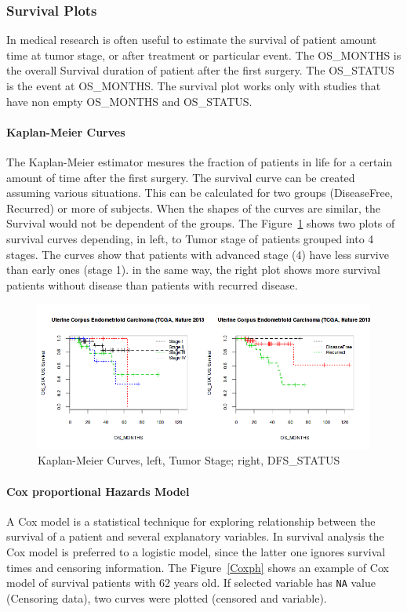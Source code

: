 \documentclass[a4paper]{article}
\begin{document}
 \subsubsection{Survival Plots}
 In medical research is often useful to estimate the survival of patient amount time at tumor stage, or after treatment or particular event. The OS\_MONTHS is the overall Survival duration of patient after the first surgery. The OS\_STATUS is the event at OS\_MONTHS. The survival plot works only with studies that have non empty OS\_MONTHS and OS\_STATUS.
 
 \paragraph{Kaplan-Meier Curves}
The Kaplan-Meier estimator mesures the fraction of patients in life for a certain amount of time after the first surgery. The survival curve can be created assuming various situations. This can be calculated for two groups (DiseaseFree, Recurred) or more of subjects. When the shapes of the curves are similar, the Survival would not be dependent of the groups. The Figure~\ref{KM} shows two plots of survival curves depending, in left, to Tumor stage of patients grouped into 4 stages. The curves show that patients with advanced stage (4) have less survive than early ones (stage 1). in the same way, the right plot shows more survival patients without disease than patients with recurred disease.   

\begin{figure}[!ht]
  \centering
 \includegraphics[scale=0.5]{image/KM.png}
 \caption{Kaplan-Meier Curves, left, Tumor Stage; right, DFS\_STATUS}
 \label{KM}
 \end{figure}
 
\paragraph{Cox proportional Hazards Model}
 A Cox model is a statistical technique for exploring relationship between the survival of a patient and several explanatory variables. In survival analysis the Cox model is preferred to a logistic model, since the latter one ignores survival times and censoring information. The Figure~\ref{Coxph} shows an example of Cox model of survival patients with 62 years old.
 If selected variable has \texttt{NA} value (Censoring data), two curves were plotted (censored and variable).
 
\end{document}
